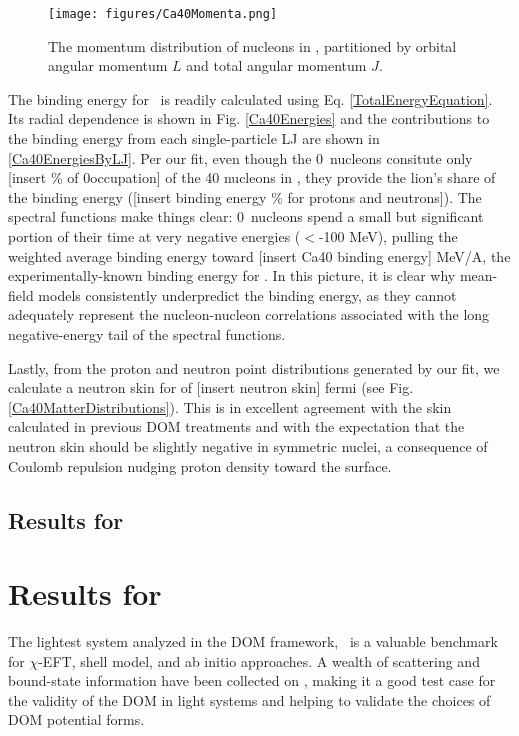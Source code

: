 \begin{figure}[ht!]
    \centering
    \texttt{[image: figures/Ca40Momenta.png]}
    \caption[The single-particle momentum distributions in \caForty]
    {
        The momentum distribution of nucleons in \caForty, partitioned
        by orbital angular momentum $L$ and total angular momentum $J$.
    }
    \label{Ca40Momenta}
\end{figure}

The binding energy for \caForty\ is readily calculated using Eq.
\ref{TotalEnergyEquation}. Its radial dependence is shown in Fig. \ref{Ca40Energies} and the
contributions to the binding energy from each single-particle LJ are shown in
\ref{Ca40EnergiesByLJ}. Per our fit, even though the 0\sOne\ nucleons consitute only [insert \%
of 0\sOne occupation] of the 40 nucleons in \caForty, they provide the lion's share of the binding
energy ([insert binding energy \% for protons and neutrons]). The spectral
functions make things clear: 0\sOne\ nucleons spend a small but significant portion of their time 
at very negative energies ($<$-100 MeV), pulling the weighted average binding energy toward
[insert Ca40 binding energy] MeV/A, the experimentally-known binding energy for \caForty. In this
picture, it is clear why mean-field models consistently underpredict the binding energy, as they
cannot adequately represent the nucleon-nucleon correlations associated with the long
negative-energy tail of the spectral functions.

Lastly, from the proton and neutron point distributions generated by our fit, we calculate a
\caForty neutron skin for of [insert neutron skin] fermi (see Fig. \ref{Ca40MatterDistributions}). 
This is in excellent agreement with the skin calculated in previous DOM treatments
\cite{MahzoonPhDThesis} and with the expectation that the neutron skin should be slightly negative in
symmetric nuclei, a consequence of Coulomb repulsion nudging proton density toward the surface.

\subsection{Results for \caEight}

\section{Results for \oSixEight}
The lightest system analyzed in the DOM framework, \oSix\ is a valuable benchmark
for $\chi$-EFT, shell model, and ab initio approaches. A wealth of scattering and
bound-state information have been collected on \oSix, making it a good test case for the validity
of the DOM in light systems and helping to validate the choices of DOM potential forms.

